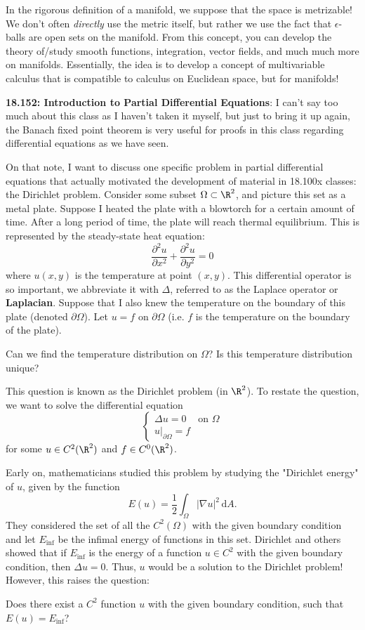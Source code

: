 In the rigorous definition of a manifold, we suppose that the space is metrizable! We don't often \textit{directly} use the metric itself, but rather we use the fact that $\epsilon$-balls are open sets on the manifold. From this concept, you can develop the theory of/study smooth functions, integration, vector fields, and much much more on manifolds. Essentially, the idea is to develop a concept of multivariable calculus that is compatible to calculus on Euclidean space, but for manifolds!

\textbf{18.152: Introduction to Partial Differential Equations}: I can't say too much about this class as I haven't taken it myself, but just to bring it up again, the Banach fixed point theorem is very useful for proofs in this class regarding differential equations as we have seen.

On that note, I want to discuss one specific problem in partial differential equations that actually motivated the development of material in 18.100x classes: the Dirichlet problem. Consider some subset $\Omega \subset \R^2$, and picture this set as a metal plate. Suppose I heated the plate with a blowtorch for a certain amount of time. After a long period of time, the plate will reach thermal equilibrium. This is represented by the steady-state heat equation:
\[
\frac{\partial^2 u }{\partial x^2} + \frac{\partial^2 u }{\partial y^2} = 0
\]
where $u(x,y)$ is the temperature at point $(x,y).$ This differential operator is so important, we abbreviate it with $\Delta$, referred to as the Laplace operator or \textbf{Laplacian}. Suppose that I also knew the temperature on the boundary of this plate (denoted $\partial \Omega$). Let $u = f$ on $\partial \Omega$ (i.e. $f$ is the temperature on the boundary of the plate).

\begin{question}
Can we find the temperature distribution on $\Omega$? Is this temperature distribution unique?
\end{question}

 This question is known as the Dirichlet problem (in $\R^2$). To restate the question, we want to  solve the differential equation 
\[
\begin{cases}
\Delta u = 0 &\text{on } \Omega \\
u\bigr|_{\partial \Omega} = f
\end{cases}
\]
for some $u\in C^2(\R^2)$ and $f\in C^0(\R^2)$.

Early on, mathematicians studied this problem by studying the "Dirichlet energy" of $u$, given by the function 
\[
E(u) = \frac{1}{2}\int_\Omega
 |\nabla u|^2 \,\mathrm dA.
\]
They considered the set of all the $C^2(\Omega)$ with the given boundary condition and let $E_{\text{inf}}$ be the infimal energy of functions in this set. Dirichlet and others showed that if $E_{\text{inf}}$ is the energy of a function $u\in C^2$ with the given boundary condition, then $\Delta u = 0$. Thus, $u$ would be a solution to the Dirichlet problem! However, this raises the question:
\begin{question}[Question 1]
Does there exist a $C^2$ function $u$ with the given boundary condition, such that $E(u) = E_{\text{inf}}$?
\end{question}

